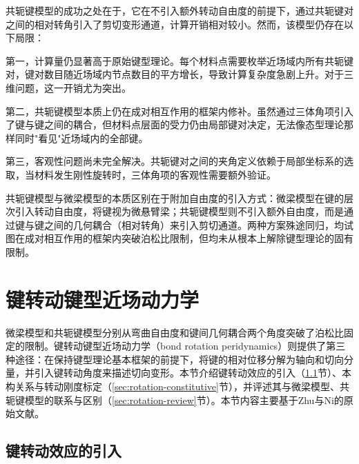 共轭键模型的成功之处在于，它在不引入额外转动自由度的前提下，通过共轭键对之间的相对转角引入了剪切变形通道，计算开销相对较小。然而，该模型仍存在以下局限：

第一，计算量仍显著高于原始键型理论。每个材料点需要枚举近场域内所有共轭键对，键对数目随近场域内节点数目的平方增长，导致计算复杂度急剧上升。对于三维问题，这一开销尤为突出。

第二，共轭键模型本质上仍在成对相互作用的框架内修补。虽然通过三体角项引入了键与键之间的耦合，但材料点层面的受力仍由局部键对决定，无法像态型理论那样同时"看见"近场域内的全部键。

第三，客观性问题尚未完全解决。共轭键对之间的夹角定义依赖于局部坐标系的选取，当材料发生刚性旋转时，三体角项的客观性需要额外验证。

\begin{remark}
  共轭键模型与微梁模型的本质区别在于附加自由度的引入方式：微梁模型在键的层次引入转动自由度，将键视为微悬臂梁；共轭键模型则不引入额外自由度，而是通过键与键之间的几何耦合（相对转角）来引入剪切通道。两种方案殊途同归，均试图在成对相互作用的框架内突破泊松比限制，但均未从根本上解除键型理论的固有限制。
\end{remark}


\section{键转动键型近场动力学}\label{sec:bond-rotation}

微梁模型和共轭键模型分别从弯曲自由度和键间几何耦合两个角度突破了泊松比固定的限制。键转动键型近场动力学（bond rotation peridynamics）则提供了第三种途径：在保持键型理论基本框架的前提下，将键的相对位移分解为轴向和切向分量，并引入键转动角度来描述切向变形。本节介绍键转动效应的引入（\ref{sec:rotation-intro}节）、本构关系与转动刚度标定（\ref{sec:rotation-constitutive}节），并评述其与微梁模型、共轭键模型的联系与区别（\ref{sec:rotation-review}节）。本节内容主要基于Zhu与Ni\cite{ZhuNi2017}的原始文献。

\subsection{键转动效应的引入}\label{sec:rotation-intro}

